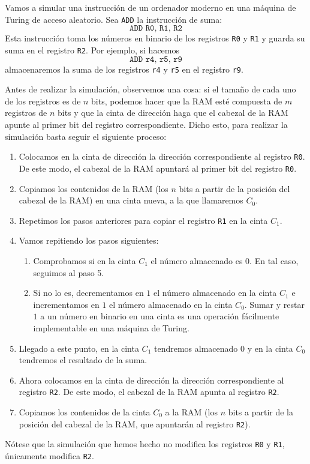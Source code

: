 \begin{ejemplo}
Vamos a simular una instrucción de un ordenador moderno en una máquina de Turing de acceso aleatorio. Sea \texttt{ADD} la instrucción de suma:
$$\texttt{ADD R0, R1, R2}$$
Esta instrucción toma los números en binario de los registros \texttt{R0} y \texttt{R1} y guarda su suma en el registro \texttt{R2}. Por ejemplo, si hacemos
$$\texttt{ADD r4, r5, r9}$$
almacenaremos la suma de los registros \texttt{r4} y \texttt{r5} en el registro \texttt{r9}.

Antes de realizar la simulación, observemos una cosa: si el tamaño de cada uno de los registros es de $n$ bits, podemos hacer que la RAM esté compuesta de $m$ registros de $n$ bits y que la cinta de dirección haga que el cabezal de la RAM apunte al primer bit del registro correspondiente. Dicho esto, para realizar la simulación basta seguir el siguiente proceso:
\begin{enumerate}
    \item Colocamos en la cinta de dirección la dirección correspondiente al registro \texttt{R0}. De este modo, el cabezal de la RAM apuntará al primer bit del registro \texttt{R0}.
    \item Copiamos los contenidos de la RAM (los $n$ bits a partir de la posición del cabezal de la RAM) en una cinta nueva, a la que llamaremos $C_0$.
    \item Repetimos los pasos anteriores para copiar el registro \texttt{R1} en la cinta $C_1$.
    \item Vamos repitiendo los pasos siguientes:
    \begin{enumerate}
        \item Comprobamos si en la cinta $C_1$ el número almacenado es $0$. En tal caso, seguimos al paso 5.
        \item Si no lo es, decrementamos en $1$ el número almacenado en la cinta $C_1$ e incrementamos en $1$ el número almacenado en la cinta $C_0$. Sumar y restar $1$ a un número en binario en una cinta es una operación fácilmente implementable en una máquina de Turing.
    \end{enumerate}
    \item Llegado a este punto, en la cinta $C_1$ tendremos almacenado $0$ y en la cinta $C_0$ tendremos el resultado de la suma.
    \item Ahora colocamos en la cinta de dirección la dirección correspondiente al registro \texttt{R2}. De este modo, el cabezal de la RAM apunta al registro \texttt{R2}.
    \item Copiamos los contenidos de la cinta $C_0$ a la RAM (los $n$ bits a partir de la posición del cabezal de la RAM, que apuntarán al registro \texttt{R2}).
\end{enumerate}
Nótese que la simulación que hemos hecho no modifica los registros \texttt{R0} y \texttt{R1}, únicamente modifica \texttt{R2}.
\end{ejemplo}


